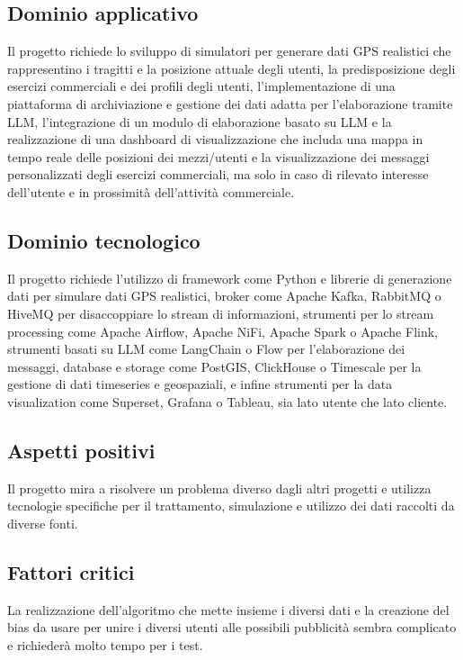 \documentclass[italian, 12pt]{article}
\begin{document}
\subsection{Dominio applicativo}
Il progetto richiede lo sviluppo di simulatori per generare dati GPS realistici che rappresentino i tragitti e la posizione attuale degli utenti, la predisposizione degli esercizi commerciali e dei profili degli utenti, l'implementazione di una piattaforma di archiviazione e gestione dei dati adatta per l'elaborazione tramite LLM, l'integrazione di un modulo di elaborazione basato su LLM e la realizzazione di una dashboard di visualizzazione che includa una mappa in tempo reale delle posizioni dei mezzi/utenti e la visualizzazione dei messaggi personalizzati degli esercizi commerciali, ma solo in caso di rilevato interesse dell'utente e in prossimità dell'attività commerciale.

\subsection{Dominio tecnologico}
Il progetto richiede l'utilizzo di framework come Python e librerie di generazione dati per simulare dati GPS realistici, broker come Apache Kafka, RabbitMQ o HiveMQ per disaccoppiare lo stream di informazioni, strumenti per lo stream processing come Apache Airflow, Apache NiFi, Apache Spark o Apache Flink, strumenti basati su LLM come LangChain o Flow per l'elaborazione dei messaggi, database e storage come PostGIS, ClickHouse o Timescale per la gestione di dati timeseries e geospaziali, e infine strumenti per la data visualization come Superset, Grafana o Tableau, sia lato utente che lato cliente.

\subsection{Aspetti positivi}
Il progetto mira a risolvere un problema diverso dagli altri progetti e utilizza tecnologie specifiche per il trattamento, simulazione e utilizzo dei dati raccolti da diverse fonti.

\subsection{Fattori critici}
La realizzazione dell'algoritmo che mette insieme i diversi dati e la creazione del bias da usare per unire i diversi utenti alle possibili pubblicità sembra complicato e richiederà molto tempo per i test.
\end{document}

